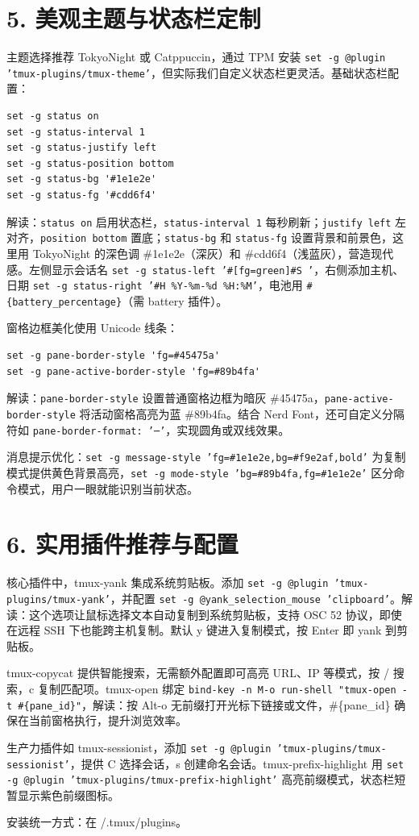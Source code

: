 \chapter{5. 美观主题与状态栏定制}
主题选择推荐 TokyoNight 或 Catppuccin，通过 TPM 安装 \texttt{set -g @plugin 'tmux-plugins/tmux-theme'}，但实际我们自定义状态栏更灵活。基础状态栏配置：\par
\begin{lstlisting}
set -g status on
set -g status-interval 1
set -g status-justify left
set -g status-position bottom
set -g status-bg '#1e1e2e'
set -g status-fg '#cdd6f4'
\end{lstlisting}
解读：\texttt{status on} 启用状态栏，\texttt{status-interval 1} 每秒刷新；\texttt{justify left} 左对齐，\texttt{position bottom} 置底；\texttt{status-bg} 和 \texttt{status-fg} 设置背景和前景色，这里用 TokyoNight 的深色调 \#{}1e1e2e（深灰）和 \#{}cdd6f4（浅蓝灰），营造现代感。左侧显示会话名 \texttt{set -g status-left '\#{}[fg=green]\#{}S '}，右侧添加主机、日期 \texttt{set -g status-right '\#{}H \%{}Y-\%{}m-\%{}d \%{}H:\%{}M'}，电池用 \texttt{\#{}\{{}battery\_{}percentage\}{}}（需 battery 插件）。\par
窗格边框美化使用 Unicode 线条：\par
\begin{lstlisting}
set -g pane-border-style 'fg=#45475a'
set -g pane-active-border-style 'fg=#89b4fa'
\end{lstlisting}
解读：\texttt{pane-border-style} 设置普通窗格边框为暗灰 \#{}45475a，\texttt{pane-active-border-style} 将活动窗格高亮为蓝 \#{}89b4fa。结合 Nerd Font，还可自定义分隔符如 \texttt{pane-border-format: '─'}，实现圆角或双线效果。\par
消息提示优化：\texttt{set -g message-style 'fg=\#{}1e1e2e,bg=\#{}f9e2af,bold'} 为复制模式提供黄色背景高亮，\texttt{set -g mode-style 'bg=\#{}89b4fa,fg=\#{}1e1e2e'} 区分命令模式，用户一眼就能识别当前状态。\par
\chapter{6. 实用插件推荐与配置}
核心插件中，tmux-yank 集成系统剪贴板。添加 \texttt{set -g @plugin 'tmux-plugins/tmux-yank'}，并配置 \texttt{set -g @yank\_{}selection\_{}mouse 'clipboard'}。解读：这个选项让鼠标选择文本自动复制到系统剪贴板，支持 OSC 52 协议，即使在远程 SSH 下也能跨主机复制。默认 y 键进入复制模式，按 Enter 即 yank 到剪贴板。\par
tmux-copycat 提供智能搜索，无需额外配置即可高亮 URL、IP 等模式，按 / 搜索，c 复制匹配项。tmux-open 绑定 \texttt{bind-key -n M-o run-shell "tmux-open -t \#{}\{{}pane\_{}id\}{}"}，解读：按 Alt-o 无前缀打开光标下链接或文件，\#{}\{{}pane\_{}id\}{} 确保在当前窗格执行，提升浏览效率。\par
生产力插件如 tmux-sessionist，添加 \texttt{set -g @plugin 'tmux-plugins/tmux-sessionist'}，提供 C 选择会话，s 创建命名会话。tmux-prefix-highlight 用 \texttt{set -g @plugin 'tmux-plugins/tmux-prefix-highlight'} 高亮前缀模式，状态栏短暂显示紫色前缀图标。\par
安装统一方式：在 /.tmux/plugins。\par
